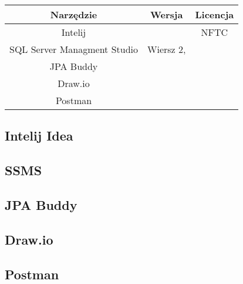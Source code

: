 \begin{tabular}{|c|c|c|}
    \hline
    Narzędzie & Wersja & Licencja \\
    \hline
    Intelij &  &  NFTC\\
    \hline
    SQL Server Managment Studio & Wiersz 2, & \\
    \hline
    JPA Buddy & & \\
    \hline
		Draw.io & &\\
    \hline
		Postman & &\\
    \hline
\end{tabular}


\subsection{Intelij Idea}

\subsection{SSMS}

\subsection{JPA Buddy}
\subsection{Draw.io}
\subsection{Postman}




